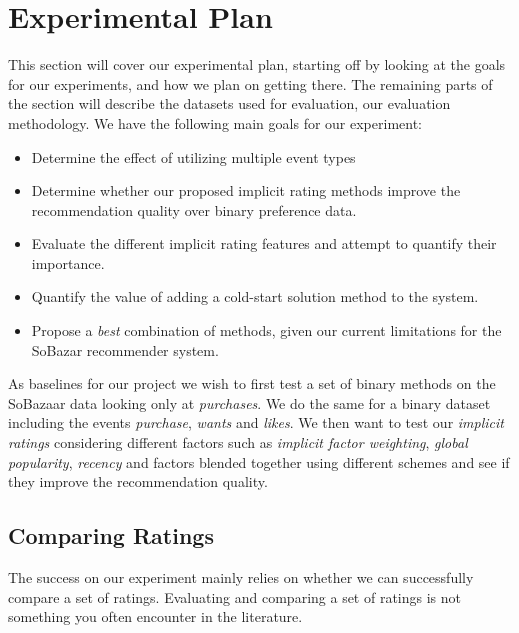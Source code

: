 \clearpage
\section{Experimental Plan}
\label{sec:experimental-plan}


This section will cover our experimental plan, starting off by looking at the
goals for our experiments, and how we plan on getting there. The remaining parts of
the section will describe the datasets used for evaluation, our evaluation methodology.
We have the following main goals for our experiment:

\begin{itemize}
	\item Determine the effect of utilizing multiple event types
	\item Determine whether our proposed implicit rating methods improve the recommendation quality over
	binary preference data.
	\item Evaluate the different implicit rating features and attempt to quantify their importance.
	\item Quantify the value of adding a cold-start solution method to the system.
	\item Propose a \emph{best} combination of methods, given our current limitations for the SoBazar recommender system.
\end{itemize}

As baselines for our project we wish to first test a set of binary methods on the SoBazaar data
looking only at \emph{purchases}. We do the same for a binary dataset including the events
\emph{purchase}, \emph{wants} and \emph{likes}. We then want to test our \emph{implicit ratings}
considering different factors such as \emph{implicit factor weighting}, \emph{global popularity},
\emph{recency} and factors blended together using different schemes and see if they improve the
recommendation quality.

\subsection{Comparing Ratings}

The success on our experiment mainly relies on whether we can successfully compare a set of ratings.
Evaluating and comparing a set of ratings is not something you often encounter in the literature. 

